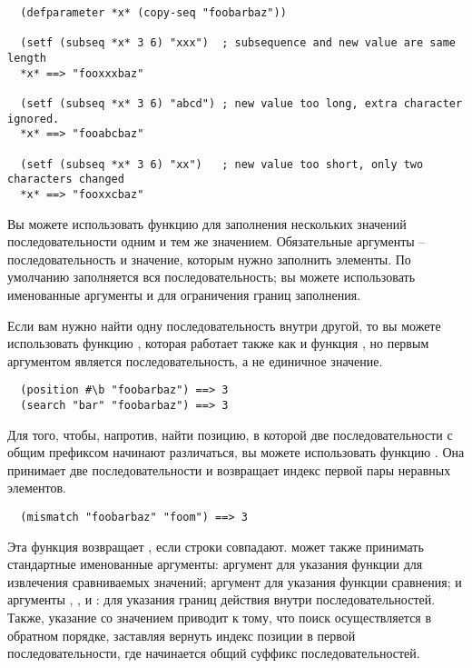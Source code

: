 \begin{verbatim}
  (defparameter *x* (copy-seq "foobarbaz"))

  (setf (subseq *x* 3 6) "xxx")  ; subsequence and new value are same length
  *x* ==> "fooxxxbaz"

  (setf (subseq *x* 3 6) "abcd") ; new value too long, extra character ignored.
  *x* ==> "fooabcbaz"

  (setf (subseq *x* 3 6) "xx")   ; new value too short, only two characters changed
  *x* ==> "fooxxcbaz"
\end{verbatim}

Вы можете использовать функцию  для заполнения нескольких значений
последовательности одним и тем же значением.  Обязательные аргументы --
последовательность и значение, которым нужно заполнить элементы.  По умолчанию
заполняется вся последовательность; вы можете использовать именованные аргументы
 и  для ограничения границ заполнения.

Если вам нужно найти одну последовательность внутри другой, то вы можете использовать
функцию , которая работает также как и функция , но первым
аргументом является последовательность, а не единичное значение.

\begin{verbatim}
  (position #\b "foobarbaz") ==> 3
  (search "bar" "foobarbaz") ==> 3
\end{verbatim}

Для того, чтобы, напротив, найти позицию, в которой две последовательности с общим
префиксом начинают различаться, вы можете использовать функцию .  Она
принимает две последовательности и возвращает индекс первой пары неравных элементов.

\begin{verbatim}
  (mismatch "foobarbaz" "foom") ==> 3
\end{verbatim}

Эта функция возвращает , если строки совпадают.  может также
принимать стандартные именованные аргументы: аргумент  для указания функции для
извлечения сравниваемых значений; аргумент  для указания функции сравнения; и
аргументы , ,  и : для указания границ
действия внутри последовательностей.  Также, указание  со значением
 приводит к тому, что поиск осуществляется в обратном порядке, заставляя
 вернуть индекс позиции в первой последовательности, где начинается общий
суффикс последовательностей.

